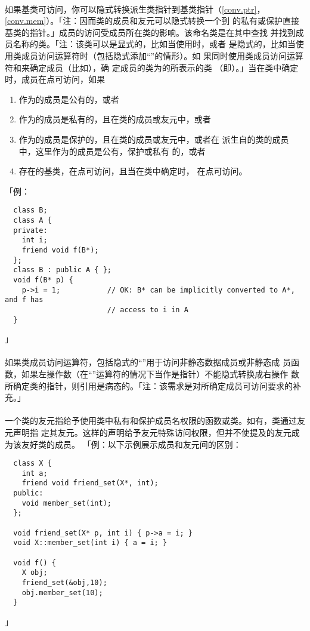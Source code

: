 \paragraph{}
如果基类可访问，你可以隐式转换派生类指针到基类指针（\ref{conv.ptr}，
\ref{conv.mem}）。「注：因而类的成员和友元可以隐式转换一个到
的私有或保护直接基类的指针。」成员的访问受成员所在类的影响。该命名类是在其中查找
并找到成员名称的类。「注：该类可以是显式的，比如当使用时，或者
是隐式的，比如当使用类成员访问运算符时（包括隐式添加``''的情形）。如
果同时使用类成员访问运算符和来确定成员（比如），确
定成员的类为的所表示的类
（即）。」当在类中确定时，成员在点可访问，如果
\begin{enumerate}
  \item{作为的成员是公有的，或者}
  \item{作为的成员是私有的，且在类的成员或友元中，或者}
  \item{作为的成员是保护的，且在类的成员或友元中，或者在
    派生自的类的成员中，这里作为的成员是公有，保护或私有
    的，或者}
  \item{存在的基类，在点可访问，且当在类中确定时，
    在点可访问。}
\end{enumerate}
「例：
\begin{lstlisting}
  class B;
  class A {
  private:
    int i;
    friend void f(B*);
  };
  class B : public A { };
  void f(B* p) {
    p->i = 1;           // OK: B* can be implicitly converted to A*, and f has
                        // access to i in A
  }
\end{lstlisting}」

\paragraph{}
如果类成员访问运算符，包括隐式的``''用于访问非静态数据成员或非静态成
员函数，如果左操作数（在``''运算符的情况下当作是指针）不能隐式转换成右操作
数所确定类的指针，则引用是病态的。「注：该需求是对所确定成员可访问要求的补充。」

\paragraph{}
一个类的友元指给予使用类中私有和保护成员名权限的函数或类。如有，类通过友元声明指
定其友元。这样的声明给予友元特殊访问权限，但并不使提及的友元成为该友好类的成员。
「例：以下示例展示成员和友元间的区别：
\begin{lstlisting}
  class X {
    int a;
    friend void friend_set(X*, int);
  public:
    void member_set(int);
  };

  void friend_set(X* p, int i) { p->a = i; }
  void X::member_set(int i) { a = i; }

  void f() {
    X obj;
    friend_set(&obj,10);
    obj.member_set(10);
  }
\end{lstlisting}」


